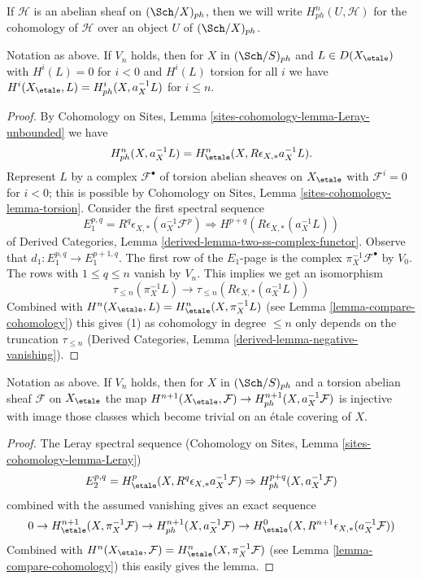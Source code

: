 \noindent
If $\mathcal{H}$ is an abelian sheaf on $(\Sch/X)_{ph}$,
then we will write $H^n_{ph}(U, \mathcal{H})$ for the cohomology
of $\mathcal{H}$ over an object $U$ of $(\Sch/X)_{ph}$.

\begin{lemma}
\label{lemma-V-implies-cohomology-etale-ph}
Notation as above. If $V_n$ holds, then for
$X$ in $(\Sch/S)_{ph}$ and $L \in D(X_\etale)$
with $H^i(L) = 0$ for $i < 0$ and $H^i(L)$ torsion for all $i$
we have $H^i(X_\etale, L) = H^i_{ph}(X, a_X^{-1}L)$ for $i \leq n$.
\end{lemma}

\begin{proof}
By Cohomology on Sites, Lemma \ref{sites-cohomology-lemma-Leray-unbounded}
we have
$$
H^n_{ph}(X, a_X^{-1}L) = H^n_\etale(X, R\epsilon_{X, *}a_X^{-1}L).
$$
Represent $L$ by a complex $\mathcal{F}^\bullet$ of torsion abelian
sheaves on $X_\etale$ with $\mathcal{F}^i = 0$ for $i < 0$; this is
possible by Cohomology on Sites, Lemma \ref{sites-cohomology-lemma-torsion}.
Consider the first spectral sequence
$$
E_1^{p, q} = R^q\epsilon_{X, *}(a_X^{-1}\mathcal{F}^p)
\Rightarrow H^{p + q}(R\epsilon_{X, *}(a_X^{-1}L))
$$
of Derived Categories, Lemma \ref{derived-lemma-two-ss-complex-functor}.
Observe that $d_1 : E_1^{p, q} \to E_1^{p + 1, q}$.
The first row of the $E_1$-page is the complex
$\pi_X^{-1}\mathcal{F}^\bullet$ by $V_0$.
The rows with $1 \leq q \leq n$ vanish by $V_n$.
This implies we get an isomorphism
$$
\tau_{\leq n}(\pi_X^{-1} L)
\longrightarrow
\tau_{\leq n}(R\epsilon_{X, *}(a_X^{-1}L))
$$
Combined with $H^n(X_\etale, L) = H^n_\etale(X, \pi_X^{-1}L)$
(see Lemma \ref{lemma-compare-cohomology}) this
gives (1) as cohomology in degree $\leq n$ only depends on the truncation
$\tau_{\leq n}$ (Derived Categories, Lemma
\ref{derived-lemma-negative-vanishing}).
\end{proof}

\begin{lemma}
\label{lemma-V-implies-cohomology-etale-ph-extra}
Notation as above. If $V_n$ holds, then for
$X$ in $(\Sch/S)_{ph}$ and a torsion abelian sheaf $\mathcal{F}$ on $X_\etale$
the map
$H^{n + 1}(X_\etale, \mathcal{F}) \to H^{n + 1}_{ph}(X, a_X^{-1}\mathcal{F})$
is injective with image those classes which become trivial on
an \'etale covering of $X$.
\end{lemma}

\begin{proof}
The Leray spectral sequence (Cohomology on Sites, Lemma
\ref{sites-cohomology-lemma-Leray})
$$
E_2^{p, q} = H^p_\etale(X, R^q\epsilon_{X, *}a_X^{-1}\mathcal{F})
\Rightarrow
H^{p + q}_{ph}(X, a_X^{-1}\mathcal{F})
$$
combined with the assumed vanishing gives an exact sequence
$$
0 \to
H^{n + 1}_\etale(X, \pi_X^{-1}\mathcal{F}) \to
H^{n + 1}_{ph}(X, a_X^{-1}\mathcal{F}) \to
H^0_\etale(X, R^{n + 1}\epsilon_{X, *}(a_X^{-1}\mathcal{F}))
$$
Combined with
$H^n(X_\etale, \mathcal{F}) = H^n_\etale(X, \pi_X^{-1}\mathcal{F})$
(see Lemma \ref{lemma-compare-cohomology}) this easily gives the lemma.
\end{proof}

